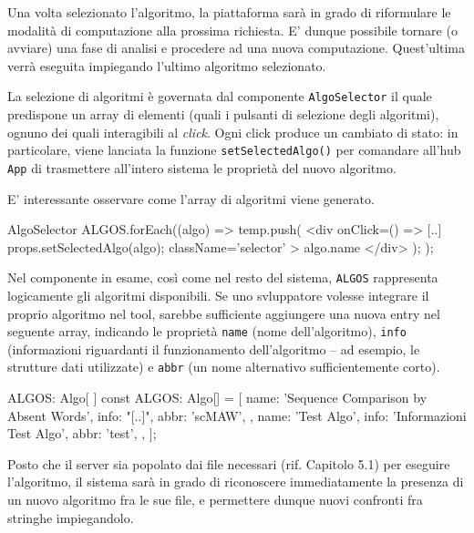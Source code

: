 \vspace{3mm}

Una volta selezionato l'algoritmo, la piattaforma sarà in grado di riformulare le modalità di computazione alla prossima richiesta. E' dunque possibile tornare (o avviare) una fase di analisi e procedere ad una nuova computazione. Quest'ultima verrà eseguita impiegando l'ultimo algoritmo selezionato.

\vspace{3mm}

La selezione di algoritmi è governata dal componente \verb|AlgoSelector| il quale predispone un array di elementi (quali i pulsanti di selezione degli algoritmi), ognuno dei quali interagibili al \textit{click}. Ogni click produce un cambiato di stato: in particolare, viene lanciata la funzione \verb|setSelectedAlgo()| per comandare all'hub \verb|App| di trasmettere all'intero sistema le proprietà del nuovo algoritmo.

E' interessante osservare come l'array di algoritmi viene generato. 

\begin{sexylisting}{AlgoSelector}
ALGOS.forEach((algo) => {
  temp.push(
    <div
      onClick={() => {
		[..] props.setSelectedAlgo(algo);
	  }}
	  className='selector'
	>
	  {algo.name}
    </div>
  );
});
\end{sexylisting}

Nel componente in esame, così come nel resto del sistema, \verb|ALGOS| rappresenta logicamente gli algoritmi disponibili. Se uno svluppatore volesse integrare il proprio algoritmo nel tool, sarebbe sufficiente aggiungere una nuova entry nel seguente array, indicando le proprietà \verb|name| (nome dell'algoritmo), \verb|info| (informazioni riguardanti il funzionamento dell'algoritmo -- ad esempio, le strutture dati utilizzate) e \verb|abbr| (un nome alternativo sufficientemente corto).

\begin{sexylisting}{ALGOS: Algo[ ]}
const ALGOS: Algo[] = [
  {
    name: 'Sequence Comparison by Absent Words',
	info: "[..]",
	abbr: 'scMAW',
  },
  {
    name: 'Test Algo',
	info: 'Informazioni Test Algo',
	abbr: 'test',
  },
];
\end{sexylisting}

Posto che il server sia popolato dai file necessari (rif. Capitolo 5.1) per eseguire l'algoritmo, il sistema sarà in grado di riconoscere immediatamente la presenza di un nuovo algoritmo fra le sue file, e permettere dunque nuovi confronti fra stringhe impiegandolo.

